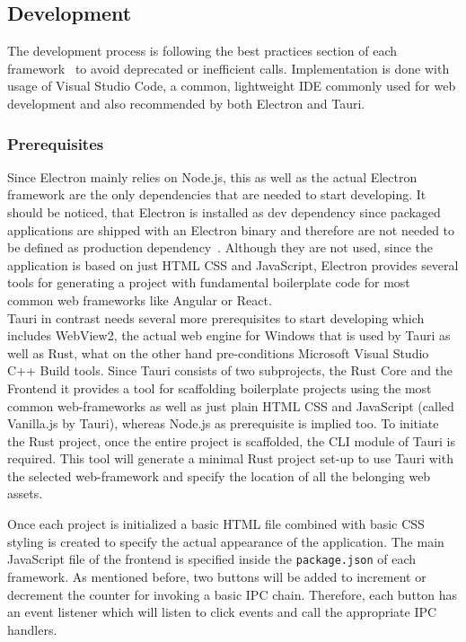 
\subsection{Development}
\label{subsec:impl:dev}
The development process is following the best practices section of each framework~\cite{ElectronDoc,tauri} to avoid deprecated or inefficient calls.
Implementation is done with usage of Visual Studio Code, a common, lightweight \ac{IDE} commonly used for web development and also recommended by both Electron and Tauri.

\subsubsection{Prerequisites}

Since Electron mainly relies on Node.js, this as well as the actual Electron framework are the only dependencies that are needed to start developing.
It should be noticed, that Electron is installed as dev dependency since packaged applications are shipped with an Electron binary and therefore are not needed to be defined as production dependency~\cite{electron-in-action}.
Although they are not used, since the application is based on just \ac{HTML} \ac{CSS} and JavaScript, Electron provides several tools for generating a project with fundamental boilerplate code for most common web frameworks like Angular or React.\\
Tauri in contrast needs several more prerequisites to start developing which includes WebView2, the actual web engine for Windows that is used by Tauri as well as Rust, what on the other hand pre-conditions Microsoft Visual Studio C++ Build tools.
Since Tauri consists of two subprojects, the Rust Core and the Frontend it provides a tool for scaffolding boilerplate projects using the most common web-frameworks as well as just plain \ac{HTML} \ac{CSS} and JavaScript (called Vanilla.js by Tauri),
whereas Node.js as prerequisite is implied too.
To initiate the Rust project, once the entire project is scaffolded, the CLI module of Tauri is required.
This tool will generate a minimal Rust project set-up to use Tauri with the selected web-framework and specify the location of all the belonging web assets.

Once each project is initialized a basic \ac{HTML} file combined with basic \ac{CSS} styling is created to specify the actual appearance of the application.
The main JavaScript file of the frontend is specified inside the \texttt{package.json} of each framework.
As mentioned before, two buttons will be added to increment or decrement the counter for invoking a basic \ac{IPC} chain.
Therefore, each button has an event listener which will listen to click events and call the appropriate \ac{IPC} handlers.

